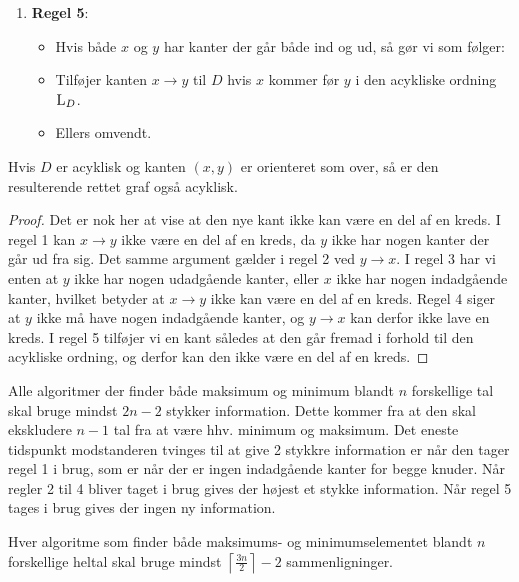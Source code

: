 \begin{enumerate}
\begin{itemize}
	      \end{itemize}
	\item \textbf{Regel 5}:
	      \begin{itemize}
		      \item Hvis både $x$ og $y$ har kanter der går både ind og ud, så gør vi som følger:
		      \item Tilføjer kanten $x \rightarrow y$ til $D$ hvis $x$ kommer før $y$ i den acykliske ordning $\textsc{L}_{D}$.
		      \item Ellers omvendt.
	      \end{itemize}
\end{enumerate}


\begin{lemma}
	Hvis $D$ er acyklisk og kanten $(x,y)$ er orienteret som over, så er den resulterende rettet graf også acyklisk.
\end{lemma}

\begin{proof}
	Det er nok her at vise at den nye kant ikke kan være en del af en kreds. I regel 1 kan $x\rightarrow y$ ikke være en del af en kreds, da $y$ ikke har nogen kanter der går ud fra sig. Det samme argument gælder i regel 2 ved $y \rightarrow x$. I regel 3 har vi enten at $y$ ikke har nogen udadgående kanter, eller $x$ ikke har nogen indadgående kanter, hvilket betyder at $x \rightarrow y$ ikke kan være en del af en kreds. Regel 4 siger at $y$ ikke må have nogen indadgående kanter, og $y \rightarrow x$ kan derfor ikke lave en kreds. I regel 5 tilføjer vi en kant således at den går fremad i forhold til den acykliske ordning, og derfor kan den ikke være en del af en kreds.
\end{proof}

Alle algoritmer der finder både maksimum og minimum blandt $n$ forskellige tal skal bruge mindst $2n-2$ stykker information. Dette kommer fra at den skal ekskludere $n-1$ tal fra at være hhv. minimum og maksimum. Det eneste tidspunkt modstanderen tvinges til at give 2 stykkre information er når den tager regel 1 i brug, som er når der er ingen indadgående kanter for begge knuder. Når regler 2 til 4 bliver taget i brug gives der højest et stykke information. Når regel 5 tages i brug gives der ingen ny information.

\begin{theorem}
	Hver algoritme som finder både maksimums- og minimumselementet blandt $n$ forskellige heltal  skal bruge mindst $\left \lceil \frac{3n}{2} \right \rceil -2$ sammenligninger.
\end{theorem}

